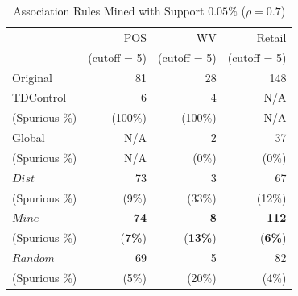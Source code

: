 

\begin{table}[th]
\caption{Association Rules Mined with Support $0.05\%$ ($\rho=0.7$)}
\centering
\begin{tabular}{|l|r|r|r|}
  \hline
   & POS & WV  & Retail \\
 & (cutoff = 5) &(cutoff = 5) & (cutoff = 5) \\\hline \hline
 Original & 81 & 28 & 148 \\\hline
  TDControl& 6 & 4 & N/A \\
 (Spurious \%) & (100\%) & (100\%) & N/A \\\hline
Global &  N/A  & 2 & 37\\
(Spurious \%) &  N/A  & (0\%) & (0\%)\\\hline
  $Dist$ & 73 & 3 & 67 \\
(Spurious \%) & (9\%) & (33\%) & (12\%)\\\hline
$Mine$ & {\bf74} &{\bf8} & {\bf112}\\
(Spurious \%) & ({\bf7\%}) & ({\bf13\%}) & ({\bf6\%})\\\hline
$Random$ & 69 &5 & 82\\
(Spurious \%) & (5\%) & (20\%) & (4\%)\\\hline
\end{tabular}
\label{tab:rules2}
\end{table}


